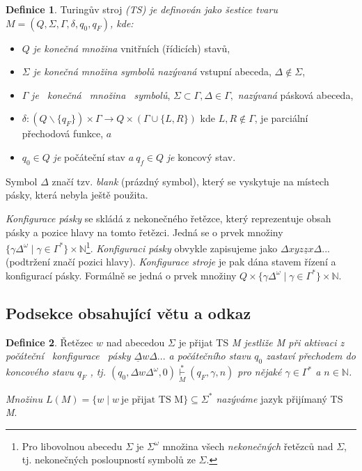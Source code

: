 \documentclass[a4paper, 11pt, twocolumn]{article}
\theoremstyle{definition}
\newtheorem{definition}{Definice}
\begin{document}
    \begin{definition}
        \label{definice_turinguv_stroj} Turingův stroj \textit{(TS) je definován jako šestice tvaru ${M = (Q, \Sigma , \Gamma, \delta, q_0, q_F )}$, kde:}
        
        \begin{itemize}
            \setlength\itemsep{0.05em}
            \item ${Q}$ \textit{je konečná množina} vnitřních (řídicích) stavů,
            \item ${\Sigma}$ \textit{je konečná množina symbolů nazývaná} vstupní abeceda, ${\Delta \notin \Sigma}$,
            \item ${\Gamma}$ \textit{je ~konečná ~množina ~symbolů}, ${\Sigma \subset \Gamma, \Delta \in \Gamma,}$ \textit{nazývaná} pásková abeceda,
            \item $\delta: (Q\backslash\{q_{F}\})\!\times\Gamma\rightarrow Q \times (\Gamma\cup\{L,R\})$ kde $L, R \notin \Gamma$, je parciální přechodová funkce, $a$
            \item ${q_0 \in Q}$ \textit{je} počáteční stav ${a ~ q_f \in Q}$ \textit{je} koncový stav.
        \end{itemize}
    
    Symbol ${\Delta}$ značí tzv. \textit{blank} (prázdný symbol), který se vyskytuje na místech pásky, která nebyla ještě použita. 
    
    \textit{Konfigurace pásky} se skládá z nekonečného řetězce, který reprezentuje obsah pásky a pozice hlavy na tomto řetězci. Jedná se o prvek množiny ${\{\gamma\Delta^\omega\mid\gamma\in\Gamma^*\}\times\mathbb{N}}$\footnote{Pro libovolnou abecedu ${\Sigma}$ je ${\Sigma^\omega}$ množina všech \textit{nekonečných} řetězců nad ${\Sigma}$, tj. nekonečných posloupností symbolů ze ${\Sigma}$.}. \textit{Konfiguraci pásky} obvykle zapisujeme jako ${\Delta xyz\underline{z}x\Delta...}$ (podtržení značí pozici hlavy). \textit{Konfigurace stroje} je pak dána stavem řízení a konfigurací pásky. Formálně se jedná o prvek množiny ${Q\times\{\gamma\Delta^\omega\mid\gamma\in\Gamma^*\}\times\mathbb{N}}$.
    \end{definition}
    
    \subsection{Podsekce obsahující větu a odkaz}
    \begin{definition}
        \label{definice_retezec} Řetězec ${w}$ nad abecedou ${\Sigma}$ je přijat TS \textit{M jestliže M při aktivaci z počáteční ~konfigurace ~pásky ${\underline{\Delta}w\Delta...}$ a počátečního stavu ${q_0}$ zastaví přechodem do koncového stavu ${q_F}$ , tj. ${(q_0,\Delta w\Delta^\omega,0)\underset{M}{\overset{*}{\vdash}}(q_F, \gamma, n)}$ pro nějaké ${\gamma \in \Gamma^*}$ a ${n \in \mathbb{N}}$.} 
        
        \textit{Množinu ${L(M) = \{w \mid w \ \text{je přijat TS M}\} \subseteq \Sigma^*}$ nazýváme} jazyk přijímaný TS \textit{M}.
    \end{definition}
    
\end{document}
